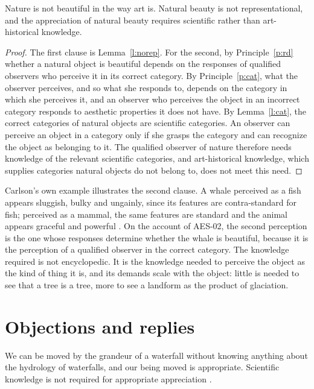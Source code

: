 \documentclass{situationist-preprint}
\begin{document}
\begin{theorem}\label{t:main}
Nature is not beautiful in the way art is. Natural beauty is not representational, and the appreciation of natural beauty requires scientific rather than art-historical knowledge.
\end{theorem}

\begin{proof}
The first clause is Lemma~\ref{l:norep}. For the second, by Principle~\ref{p:rd} whether a natural object is beautiful depends on the responses of qualified observers who perceive it in its correct category. By Principle~\ref{p:cat}, what the observer perceives, and so what she responds to, depends on the category in which she perceives it, and an observer who perceives the object in an incorrect category responds to aesthetic properties it does not have. By Lemma~\ref{l:cat}, the correct categories of natural objects are scientific categories. An observer can perceive an object in a category only if she grasps the category and can recognize the object as belonging to it. The qualified observer of nature therefore needs knowledge of the relevant scientific categories, and art-historical knowledge, which supplies categories natural objects do not belong to, does not meet this need.
\end{proof}

Carlson's own example illustrates the second clause. A whale perceived as a fish appears sluggish, bulky and ungainly, since its features are contra-standard for fish; perceived as a mammal, the same features are standard and the animal appears graceful and powerful \citep{Carlson2000}. On the account of AES-02, the second perception is the one whose responses determine whether the whale is beautiful, because it is the perception of a qualified observer in the correct category. The knowledge required is not encyclopedic. It is the knowledge needed to perceive the object as the kind of thing it is, and its demands scale with the object: little is needed to see that a tree is a tree, more to see a landform as the product of glaciation.

\section{Objections and replies}

\begin{objection}[Arousal]\label{o:arousal}
We can be moved by the grandeur of a waterfall without knowing anything about the hydrology of waterfalls, and our being moved is appropriate. Scientific knowledge is not required for appropriate appreciation \citep{NCarroll1993}.
\end{objection}
\end{document}
